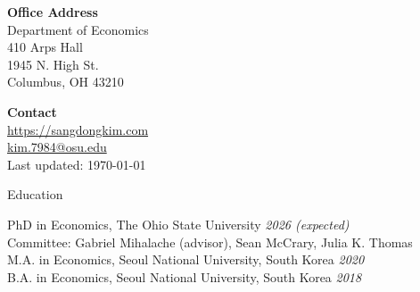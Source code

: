 \documentclass{cv} %
\begin{document}
\begin{minipage}{0.49\textwidth}
	\begin{flushleft}
		\textbf{Office Address} \\
		Department of Economics \\
		410 Arps Hall \\
		1945 N. High St.  \\
		Columbus, OH 43210
	\end{flushleft}
\end{minipage}
\begin{minipage}{0.49\textwidth}
	\begin{flushright}
		\textbf{Contact} \\
		\href{https://sangdongkim.com}{https://sangdongkim.com}\\
		\href{mailto:kim.7984@osu.edu}{kim.7984@osu.edu} \\
		Last updated: \today
		\\
	\end{flushright}
\end{minipage}
\bigskip

\begin{rSection}{Education}

{PhD in Economics, The Ohio State University} \hfill {\em 2026 (expected)} \\
	\begin{adjustbox}{minipage=0.95\textwidth, right}
		{Committee: Gabriel Mihalache (advisor), Sean McCrary, Julia K. Thomas}
	\end{adjustbox} \\
{M.A. in Economics, Seoul National University, South Korea} \hfill {\em 2020} \\
{B.A. in Economics, Seoul National University, South Korea} \hfill {\em 2018}
\end{rSection}
\bigskip
\end{document}
